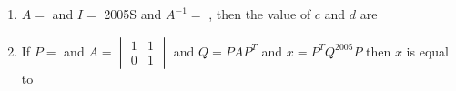 \documentclass[journal,12pt,twocolumn]{IEEEtran}
\theoremstyle{remark}
\begin{document}
\begin{enumerate}
	\item[14.] $A=$  and $I=$  \hfill{2005S}
		and $A^{-1} = $ , then the value of $c$ and $d$ are \hfill{}
	\begin{enumerate}[label =(\alph*)]
		\end{enumerate}
	

	\item[15.] If $P=$ 
			and $A = \begin{vmatrix} 1& 1 \\ 0 & 1\end{vmatrix}$ and $Q = PAP^T$ and $x=P^{T}Q^{2005}P$ then $x$ is equal to 



\end{enumerate}
\end{document}
